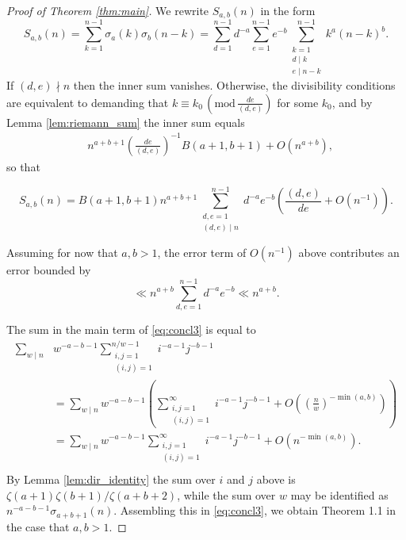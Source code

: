 \documentclass[12pt]{amsart}
\numberwithin{equation}{section}
\numberwithin{theorem}{section}
\renewcommand{\pmod}[1]{\,\left(\mathrm{mod}\,#1\right)}
\begin{document}
\begin{proof}[Proof of Theorem \ref{thm:main}]
We rewrite $S_{a, b}(n)$ in the form
\begin{equation}\label{eq:concl2}
S_{a, b}(n) = \sum_{k=1}^{n-1} \sigma_a(k) \sigma_b(n-k) = 
\sum_{d=1}^{n - 1} d^{-a}
\sum_{e=1}^{n - 1} e^{-b}
\sum_{\substack{k = 1 \\ d \mid k \\ e \mid n - k}}^{n - 1} k^a (n - k)^b.
\end{equation}
If $(d, e) \nmid n$ then the inner sum vanishes. Otherwise, the divisibility
conditions are equivalent to demanding that 
$k \equiv k_0 \pmod{\frac{de}{(d, e)}}$ for some $k_0$, and by
Lemma \ref{lem:riemann_sum} the inner sum equals
\begin{align*}
&
n^{a + b + 1} \left( \frac{de}{(d, e)} \right)^{-1}  B(a + 1, b + 1) + 
O\left(n^{a + b} \right),
\end{align*}
so that 

\begin{equation}\label{eq:concl3}
S_{a, b}(n) = B(a + 1, b + 1)  n^{a + b + 1}
\sum_{\substack{d, e=1 \\ (d, e) \mid n}}^{n - 1} d^{-a} e^{-b}
\left( \frac{(d, e)}{de} + O(n^{-1}) \right).
\end{equation}

Assuming for now that $a, b > 1$, the error term of $O(n^{-1})$ above contributes an error bounded by
\begin{equation}\label{eq:de_bound}
\ll n^{a + b} \sum_{d, e = 1}^{n - 1} d^{-a} e^{-b} 
\ll n^{a + b}.
\end{equation}

The sum in the main term of \eqref{eq:concl3} is equal to
\begin{align*}
\sum_{w \mid n} &w^{-a - b - 1} 
\sum_{\substack{i, j = 1 \\ (i, j) = 1}}^{n/w-1}  i^{-a - 1} j^{- b - 1} \\
	& =  \sum_{w \mid n} w^{-a - b - 1} 
		\left(\sum_{\substack{i, j = 1 \\ (i, j) = 1}}^{\infty}  i^{-a - 1} j^{- b - 1} 
		+ O\left( \left(\frac{n}{w} \right)^{- \min(a, b)} \right) \right) \\
	& = \sum_{w \mid n} w^{-a - b - 1}  \sum_{\substack{i, j = 1 \\ (i, j) = 1}}^{\infty}  i^{-a - 1} j^{- b - 1} + O(n^{- \min(a, b)}). \\
	\end{align*}
By Lemma \ref{lem:dir_identity} the sum over $i$ and $j$ above is $\zeta(a+1)\zeta(b+1)/\zeta(a+b+2)$, while the sum over $w$ may be identified as $n^{-a-b-1}\sigma_{a+b+1}(n)$.  Assembling this in \eqref{eq:concl3}, we obtain Theorem 1.1 in the case that $a,b>1$.



\end{proof}
\end{document}
